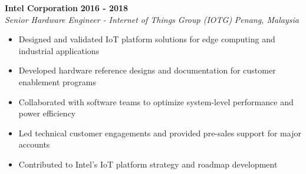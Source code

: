\textbf{Intel Corporation} \hfill \textbf{2016 - 2018} \\
\textit{Senior Hardware Engineer - Internet of Things Group (IOTG)} \hfill \textit{Penang, Malaysia} \\
\vspace{-0.4mm}
\begin{itemize}[leftmargin=0.5cm, label={\textbullet}]
\item Designed and validated IoT platform solutions for edge computing and industrial applications
\item Developed hardware reference designs and documentation for customer enablement programs
\item Collaborated with software teams to optimize system-level performance and power efficiency
\item Led technical customer engagements and provided pre-sales support for major accounts
\item Contributed to Intel's IoT platform strategy and roadmap development
\end{itemize}
\vspace{0.2mm}